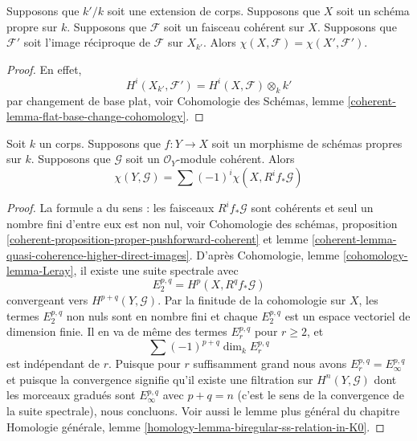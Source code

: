 \begin{lemma}
\label{lemma-euler-characteristic-extend-base-field}
Supposons que $k'/k$ soit une extension de corps. Supposons que $X$ soit un
schéma propre sur $k$. Supposons que $\mathcal{F}$ soit un faisceau
cohérent sur $X$. Supposons que $\mathcal{F}'$ soit l'image réciproque de
$\mathcal{F}$ sur $X_{k'}$. Alors $\chi(X, \mathcal{F}) = \chi(X', \mathcal{F}')$.
\end{lemma}

\begin{proof}
En effet,
$$
H^i(X_{k'}, \mathcal{F}') = H^i(X, \mathcal{F}) \otimes_k k'
$$
par changement de base plat, voir Cohomologie des
Schémas, lemme \ref{coherent-lemma-flat-base-change-cohomology}.
\end{proof}

\begin{lemma}
\label{lemma-euler-characteristic-morphism}
Soit $k$ un corps. Supposons que $f : Y \to X$ soit un morphisme de schémas
propres sur $k$. Supposons que $\mathcal{G}$ soit un $\mathcal{O}_Y$-module cohérent. Alors
$$
\chi(Y, \mathcal{G}) = \sum (-1)^i \chi(X, R^if_*\mathcal{G})
$$
\end{lemma}

\begin{proof}
La formule a du sens : les faisceaux
$R^if_*\mathcal{G}$ sont cohérents et seul un nombre
fini d'entre eux est non nul, voir Cohomologie des
schémas, proposition
\ref{coherent-proposition-proper-pushforward-coherent} et lemme
\ref{coherent-lemma-quasi-coherence-higher-direct-images}. D'après
Cohomologie, lemme \ref{cohomology-lemma-Leray}, il existe une suite spectrale avec
$$
E_2^{p, q} = H^p(X, R^qf_*\mathcal{G})
$$
convergeant vers $H^{p + q}(Y, \mathcal{G})$. Par la finitude de la
cohomologie sur $X$, les termes $E_2^{p, q}$ non nuls sont en nombre
fini et chaque $E_2^{p, q}$ est un espace vectoriel de dimension finie.
Il en va de même des termes $E_r^{p, q}$ pour $r \geq 2$, et
$$
\sum (-1)^{p + q} \dim_k E_r^{p, q}
$$
est indépendant de $r$. Puisque pour $r$ suffisamment grand
nous avons $E_r^{p, q} = E_\infty^{p, q}$ et puisque la
convergence signifie qu'il existe une filtration sur $H^n(Y,
\mathcal{G})$ dont les morceaux gradués sont $E_\infty^{p, q}$
avec $p + q = n$ (c'est le sens de la convergence de la suite
spectrale), nous concluons. Voir aussi le lemme plus général du chapitre
Homologie générale, lemme \ref{homology-lemma-biregular-ss-relation-in-K0}.
\end{proof}








